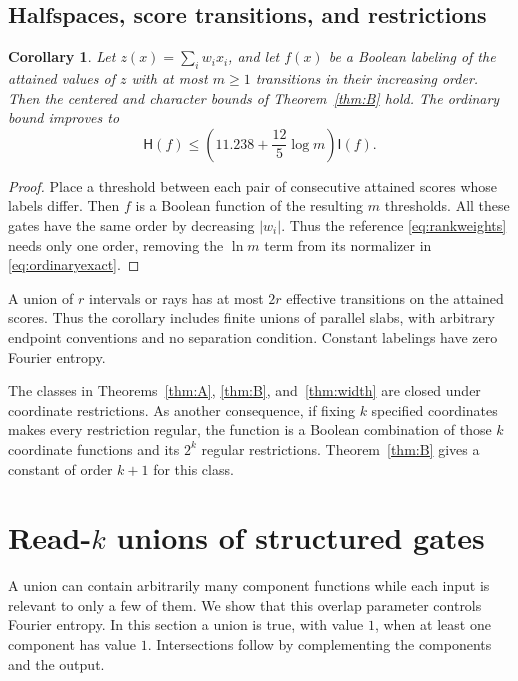\documentclass[11pt]{amsart}
\newtheorem{corollary}[theorem]{Corollary}
\theoremstyle{definition}
\theoremstyle{remark}
\newcommand{\HH}{\mathsf H}
\newcommand{\I}{\mathsf I}
\begin{document}
\subsection{Halfspaces, score transitions, and restrictions}

\begin{corollary}\label{cor:scores}
Let $z(x)=\sum_iw_ix_i$, and let $f(x)$ be a Boolean labeling of the attained values of $z$ with at most $m\ge1$ transitions in their increasing order.
Then the centered and character bounds of Theorem~\ref{thm:B} hold.
The ordinary bound improves to
\[
 \HH(f)\le\left(11.238+\frac{12}{5}\log m\right)\I(f).
\]
\end{corollary}
\begin{proof}
Place a threshold between each pair of consecutive attained scores whose labels differ.
Then $f$ is a Boolean function of the resulting $m$ thresholds.
All these gates have the same order by decreasing $|w_i|$.
Thus the reference \eqref{eq:rankweights} needs only one order, removing the $\ln m$ term from its normalizer in \eqref{eq:ordinaryexact}.
\end{proof}

A union of $r$ intervals or rays has at most $2r$ effective transitions on the attained scores.
Thus the corollary includes finite unions of parallel slabs, with arbitrary endpoint conventions and no separation condition.
Constant labelings have zero Fourier entropy.

The classes in Theorems~\ref{thm:A}, \ref{thm:B}, and~\ref{thm:width} are closed under coordinate restrictions.
As another consequence, if fixing $k$ specified coordinates makes every restriction regular, the function is a Boolean combination of those $k$ coordinate functions and its $2^k$ regular restrictions.
Theorem~\ref{thm:B} gives a constant of order $k+1$ for this class.



\section{Read-\texorpdfstring{$k$}{k} unions of structured gates}\label{sec:union}

A union can contain arbitrarily many component functions while each input is relevant to only a few of them.
We show that this overlap parameter controls Fourier entropy.
In this section a union is true, with value $1$, when at least one component has value $1$.
Intersections follow by complementing the components and the output.
\end{document}
